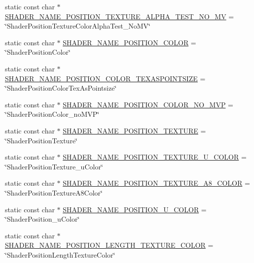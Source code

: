 \begin{Indent}
\begin{DoxyCompactItemize}
\item 
static const char $\ast$ \hyperlink{classGLProgram_a059871b3f6a7af5e4370c51d10bc0abc}{S\+H\+A\+D\+E\+R\+\_\+\+N\+A\+M\+E\+\_\+\+P\+O\+S\+I\+T\+I\+O\+N\+\_\+\+T\+E\+X\+T\+U\+R\+E\+\_\+\+A\+L\+P\+H\+A\+\_\+\+T\+E\+S\+T\+\_\+\+N\+O\+\_\+\+MV} = \char`\"{}Shader\+Position\+Texture\+Color\+Alpha\+Test\+\_\+\+No\+MV\char`\"{}
\item 
static const char $\ast$ \hyperlink{classGLProgram_af2bfd0fa0036018b7b44bc7842d12d6c}{S\+H\+A\+D\+E\+R\+\_\+\+N\+A\+M\+E\+\_\+\+P\+O\+S\+I\+T\+I\+O\+N\+\_\+\+C\+O\+L\+OR} = \char`\"{}Shader\+Position\+Color\char`\"{}
\item 
static const char $\ast$ \hyperlink{classGLProgram_ae4a8aed447022c793f96308e10168329}{S\+H\+A\+D\+E\+R\+\_\+\+N\+A\+M\+E\+\_\+\+P\+O\+S\+I\+T\+I\+O\+N\+\_\+\+C\+O\+L\+O\+R\+\_\+\+T\+E\+X\+A\+S\+P\+O\+I\+N\+T\+S\+I\+ZE} = \char`\"{}Shader\+Position\+Color\+Tex\+As\+Pointsize\char`\"{}
\item 
static const char $\ast$ \hyperlink{classGLProgram_aba8801e693839c5d83431f226d876f94}{S\+H\+A\+D\+E\+R\+\_\+\+N\+A\+M\+E\+\_\+\+P\+O\+S\+I\+T\+I\+O\+N\+\_\+\+C\+O\+L\+O\+R\+\_\+\+N\+O\+\_\+\+M\+VP} = \char`\"{}Shader\+Position\+Color\+\_\+no\+M\+VP\char`\"{}
\item 
static const char $\ast$ \hyperlink{classGLProgram_ae78776f274bb17bacddefed1f4d9d269}{S\+H\+A\+D\+E\+R\+\_\+\+N\+A\+M\+E\+\_\+\+P\+O\+S\+I\+T\+I\+O\+N\+\_\+\+T\+E\+X\+T\+U\+RE} = \char`\"{}Shader\+Position\+Texture\char`\"{}
\item 
static const char $\ast$ \hyperlink{classGLProgram_a4d47ca5d553e683127830773a2ede7aa}{S\+H\+A\+D\+E\+R\+\_\+\+N\+A\+M\+E\+\_\+\+P\+O\+S\+I\+T\+I\+O\+N\+\_\+\+T\+E\+X\+T\+U\+R\+E\+\_\+\+U\+\_\+\+C\+O\+L\+OR} = \char`\"{}Shader\+Position\+Texture\+\_\+u\+Color\char`\"{}
\item 
static const char $\ast$ \hyperlink{classGLProgram_a5bc705e2b6f454c3a1a688ef5a640f94}{S\+H\+A\+D\+E\+R\+\_\+\+N\+A\+M\+E\+\_\+\+P\+O\+S\+I\+T\+I\+O\+N\+\_\+\+T\+E\+X\+T\+U\+R\+E\+\_\+\+A8\+\_\+\+C\+O\+L\+OR} = \char`\"{}Shader\+Position\+Texture\+A8\+Color\char`\"{}
\item 
static const char $\ast$ \hyperlink{classGLProgram_a38baffebabaf2e850a7dbbb87a7621c8}{S\+H\+A\+D\+E\+R\+\_\+\+N\+A\+M\+E\+\_\+\+P\+O\+S\+I\+T\+I\+O\+N\+\_\+\+U\+\_\+\+C\+O\+L\+OR} = \char`\"{}Shader\+Position\+\_\+u\+Color\char`\"{}
\item 
static const char $\ast$ \hyperlink{classGLProgram_a396fe2d6138136c642c7f9101afc164b}{S\+H\+A\+D\+E\+R\+\_\+\+N\+A\+M\+E\+\_\+\+P\+O\+S\+I\+T\+I\+O\+N\+\_\+\+L\+E\+N\+G\+T\+H\+\_\+\+T\+E\+X\+T\+U\+R\+E\+\_\+\+C\+O\+L\+OR} = \char`\"{}Shader\+Position\+Length\+Texture\+Color\char`\"{}

\end{DoxyCompactItemize}
\end{Indent}
